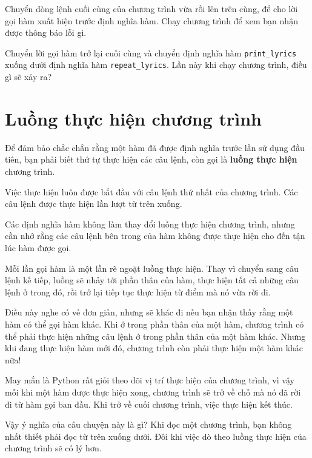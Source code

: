 \documentclass[11pt]{book}
\begin{document}
\begin{ex}
Chuyển dòng lệnh cuối cùng của chương trình vừa rồi lên trên cùng, để
cho lời gọi hàm xuất hiện trước định nghĩa hàm. Chạy chương trình
để xem bạn nhận được thông báo lỗi gì.
\end{ex}

\begin{ex}
Chuyển lời gọi hàm trở lại cuối cùng và chuyển định nghĩa hàm \verb"print_lyrics" xuống dưới định nghĩa hàm
\verb"repeat_lyrics". Lần này khi chạy chương trình, điều gì sẽ
xảy ra?
\end{ex}


\section{Luồng thực hiện chương trình}

Để đảm bảo chắc chắn rằng một hàm đã được định nghĩa trước lần sử
dụng đầu tiên, bạn phải biết thứ tự thực hiện các câu lệnh, còn gọi
là {\bf luồng thực hiện} chương trình.

Việc thực hiện luôn được bắt đầu với câu lệnh thứ nhất của chương
trình. Các câu lệnh được thực hiện lần lượt từ trên xuống.

Các định nghĩa hàm không làm thay đổi luồng thực hiện chương trình,
nhưng cần nhớ rằng các câu lệnh bên trong của hàm không được thực
hiện cho đến tận lúc hàm được gọi.

Mỗi lần gọi hàm là một lần rẽ ngoặt luồng thực hiện. Thay vì chuyển
sang câu lệnh kế tiếp, luồng sẽ nhảy tới phần thân của hàm, thực hiện
tất cả những câu lệnh ở trong đó, rồi trở lại tiếp tục thực hiện từ
điểm mà nó vừa rời đi.

Điều này nghe có vẻ đơn giản, nhưng sẽ khác đi nếu bạn nhận thấy rằng
một hàm có thể gọi hàm khác. Khi ở trong phần thân của một hàm, chương
trình có thể phải thực hiện những câu lệnh ở trong phần thân của một
hàm khác. Nhưng khi đang thực hiện hàm mới đó, chương trình còn phải
thực hiện một hàm khác nữa!

May mắn là Python rất giỏi theo dõi vị trí thực hiện của chương trình,
vì vậy mỗi khi một hàm được thực hiện xong, chương trình sẽ trở về
chỗ mà nó đã rời đi từ hàm gọi ban đầu. Khi trở về cuối chương
trình, việc thực hiện kết thúc.

Vậy ý nghĩa của câu chuyện này là gì? Khi đọc một chương trình,
bạn không nhất thiết phải đọc từ trên xuống dưới. Đôi khi việc
dò theo luồng thực hiện của chương trình sẽ có lý hơn.
\end{document}
